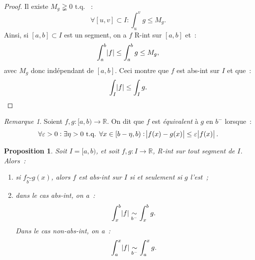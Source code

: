\documentclass{report}
\newtheorem{prp}[thm]{Proposition}
\theoremstyle{definition}
\theoremstyle{remark}
\newtheorem*{rmq}{Remarque}
\newcommand{\R}{\mathbb R}
\newcommand{\tq}{\text{ t.q. }}
\begin{document}
			\begin{proof} Il existe $M_g \gneqq 0 \tq$~:
			\[\forall [u, v] \subset I : \int_u^vg \leq M_g.\]
			Ainsi, si $[a, b] \subset I$ est un segment, on a $f$ R-int sur $[a, b]$ et~:
			\[\int_a^b\abs f \leq \int_a^b g \leq M_g,\]
			avec $M_g$ donc indépendant de $[a, b]$. Ceci montre que $f$ est abs-int sur $I$ et que~:
			\[\int_I \abs f \leq \int_I g.\]
			\end{proof}

			\begin{rmq} Soient $f, g : [a, b) \to \R$. On dit que $f$ est \textit{équivalent} à $g$ en $b^-$ lorsque~:
			\[\forall \varepsilon > 0 : \exists \eta > 0 \tq \forall x \in [b-\eta, b) : \abs {f(x)-g(x)} \leq \varepsilon \abs {f(x)}.\]
			\end{rmq}

			\begin{prp} Soit $I = [a, b)$, et soit $f, g : I \to \R$, R-int sur tout segment de $I$. Alors~:
			\begin{enumerate}
				\item si $f \underset {b^-}\sim g(x)$, alors $f$ est abs-int sur $I$ si et seulement si $g$ l'est~;
				\item dans le cas abs-int, on a~:
				\[\int_x^b\abs f \underset {b^-}\sim \int_x^b g.\]
				Dans le cas non-abs-int, on a~:
				\[\int_a^x\abs f \underset {b^-}\sim \int_a^x g.\]
			\end{enumerate}
			\end{prp}
\end{document}
